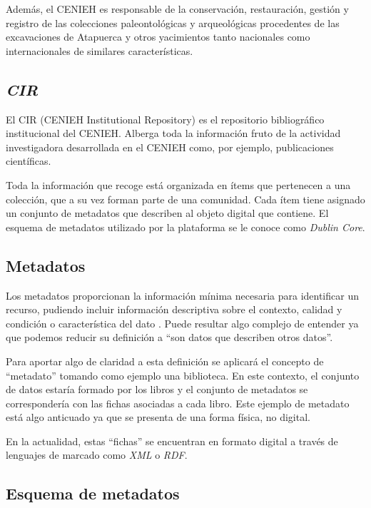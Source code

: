 Además, el CENIEH es responsable de la conservación, restauración,
gestión y registro de las colecciones paleontológicas y arqueológicas
procedentes de las excavaciones de Atapuerca y otros yacimientos tanto
nacionales como internacionales de similares características.

\subsection{\emph{CIR}}

El CIR \cite{cir:web} (CENIEH Institutional Repository) es el
repositorio bibliográfico institucional del CENIEH. Alberga toda la
información fruto de la actividad investigadora desarrollada en el
CENIEH como, por ejemplo, publicaciones científicas. 

Toda la información que recoge está organizada en ítems que pertenecen 
a una colección, que a su vez forman parte de una comunidad. Cada ítem 
tiene asignado un conjunto de metadatos que describen al objeto digital 
que contiene. El esquema de metadatos utilizado por la plataforma se le 
conoce como \emph{Dublin Core}.

\subsection{Metadatos}

Los metadatos proporcionan la información mínima necesaria para
identificar un recurso, pudiendo incluir información descriptiva sobre
el contexto, calidad y condición o característica del dato \cite{art:meta}. Puede resultar
algo complejo de entender ya que podemos reducir su definición a ``son
datos que describen otros datos''.

Para aportar algo de claridad a esta definición se aplicará el concepto de
``metadato'' tomando como ejemplo una biblioteca. En este contexto, el
conjunto de datos estaría formado por los libros y el conjunto de
metadatos se correspondería con las fichas asociadas a cada libro. Este
ejemplo de metadato está algo anticuado ya que se presenta de una forma
física, no digital.


En la actualidad, estas ``fichas'' se encuentran en formato digital a
través de lenguajes de marcado como \emph{XML} o \emph{RDF}.

\subsection{Esquema de metadatos}

